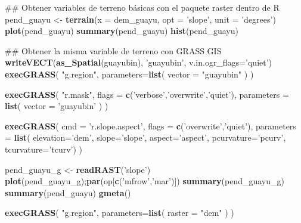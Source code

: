 \documentclass[11pt,]{article}
\newenvironment{Shaded}{\begin{snugshade}}{\end{snugshade}}
\newcommand{\KeywordTok}[1]{\textcolor[rgb]{0.13,0.29,0.53}{\textbf{#1}}}
\newcommand{\DataTypeTok}[1]{\textcolor[rgb]{0.13,0.29,0.53}{#1}}
\newcommand{\StringTok}[1]{\textcolor[rgb]{0.31,0.60,0.02}{#1}}
\newcommand{\NormalTok}[1]{#1}
\begin{document}
\begin{Shaded}
\begin{Highlighting}[]
\NormalTok{## Obtener variables de terreno básicas con el paquete raster dentro de R}
\NormalTok{pend_guayu <-}\StringTok{ }\KeywordTok{terrain}\NormalTok{(}\DataTypeTok{x =}\NormalTok{ dem_guayu, }\DataTypeTok{opt =} \StringTok{'slope'}\NormalTok{, }\DataTypeTok{unit =} \StringTok{'degrees'}\NormalTok{)}
\KeywordTok{plot}\NormalTok{(pend_guayu)}
\KeywordTok{summary}\NormalTok{(pend_guayu)}
\KeywordTok{hist}\NormalTok{(pend_guayu)}

\NormalTok{## Obtener la misma variable de terreno con GRASS GIS}
\KeywordTok{writeVECT}\NormalTok{(}\KeywordTok{as_Spatial}\NormalTok{(guayubin), }\StringTok{'guayubin'}\NormalTok{, }\DataTypeTok{v.in.ogr_flags=}\StringTok{'quiet'}\NormalTok{)}
\KeywordTok{execGRASS}\NormalTok{(}
  \StringTok{"g.region"}\NormalTok{,}
  \DataTypeTok{parameters=}\KeywordTok{list}\NormalTok{(}
    \DataTypeTok{vector =} \StringTok{"guayubin"}
\NormalTok{  )}
\NormalTok{)}

\KeywordTok{execGRASS}\NormalTok{(}
  \StringTok{"r.mask"}\NormalTok{,}
  \DataTypeTok{flags =} \KeywordTok{c}\NormalTok{(}\StringTok{'verbose'}\NormalTok{,}\StringTok{'overwrite'}\NormalTok{,}\StringTok{'quiet'}\NormalTok{),}
  \DataTypeTok{parameters =} \KeywordTok{list}\NormalTok{(}
    \DataTypeTok{vector =} \StringTok{'guayubin'}
\NormalTok{  )}
\NormalTok{)}

\KeywordTok{execGRASS}\NormalTok{(}
  \DataTypeTok{cmd =} \StringTok{'r.slope.aspect'}\NormalTok{,}
  \DataTypeTok{flags =} \KeywordTok{c}\NormalTok{(}\StringTok{'overwrite'}\NormalTok{,}\StringTok{'quiet'}\NormalTok{),}
  \DataTypeTok{parameters =} \KeywordTok{list}\NormalTok{(}
    \DataTypeTok{elevation=}\StringTok{'dem'}\NormalTok{,}
    \DataTypeTok{slope=}\StringTok{'slope'}\NormalTok{,}
    \DataTypeTok{aspect=}\StringTok{'aspect'}\NormalTok{,}
    \DataTypeTok{pcurvature=}\StringTok{'pcurv'}\NormalTok{,}
    \DataTypeTok{tcurvature=}\StringTok{'tcurv'}\NormalTok{)}
\NormalTok{)}

\NormalTok{pend_guayu_g <-}\StringTok{ }\KeywordTok{readRAST}\NormalTok{(}\StringTok{'slope'}\NormalTok{)}
\KeywordTok{plot}\NormalTok{(pend_guayu_g);}\KeywordTok{par}\NormalTok{(op[}\KeywordTok{c}\NormalTok{(}\StringTok{'mfrow'}\NormalTok{,}\StringTok{'mar'}\NormalTok{)])}
\KeywordTok{summary}\NormalTok{(pend_guayu_g)}
\KeywordTok{summary}\NormalTok{(pend_guayu)}
\KeywordTok{gmeta}\NormalTok{()}

\KeywordTok{execGRASS}\NormalTok{(}
  \StringTok{"g.region"}\NormalTok{,}
  \DataTypeTok{parameters=}\KeywordTok{list}\NormalTok{(}
    \DataTypeTok{raster =} \StringTok{"dem"}
\NormalTok{  )}
\NormalTok{)}


\end{Highlighting}
\end{Shaded}
\end{document}
